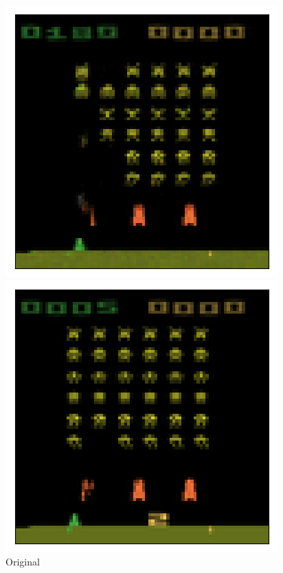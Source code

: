 \begin{figure}[h!]
\begin{multicols}{4}
    \caption{$\beta = 2$}
    \includegraphics[scale=0.4]{figures/results/colour_separated/beta_4_sample_2_reconstructed.png}
    \caption{$\beta = 4$}
\end{multicols}
\begin{multicols}{4}
    \includegraphics[scale=0.4]{figures/results/colour_separated/beta_1_sample_3_original.png}
    \caption{Original}

\end{multicols}
\end{figure}
